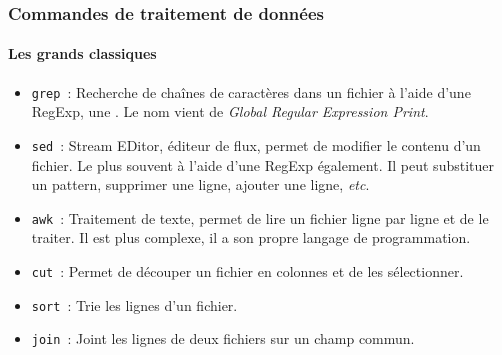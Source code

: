 \documentclass{beamer}
\begin{document}
    \begin{frame}
        \transdissolve
        \frametitle{Commandes de traitement de données}
        \framesubtitle{Les grands classiques}
        \begin{itemize}
            \item \lstinline{grep}~: Recherche de chaînes de caractères dans un fichier à l'aide d'une RegExp, une .
            Le nom vient de \textit{Global Regular Expression Print}.
            \item \lstinline{sed}~: Stream EDitor, éditeur de flux, permet de modifier le contenu d'un fichier.
            Le plus souvent à l'aide d'une RegExp également.
            Il peut substituer un pattern, supprimer une ligne, ajouter une ligne, \textit{etc}.
            \item \lstinline{awk}~: Traitement de texte, permet de lire un fichier ligne par ligne et de le traiter.
            Il est plus complexe, il a son propre langage de programmation.
            \item \lstinline{cut}~: Permet de découper un fichier en colonnes et de les sélectionner.
            \item \lstinline{sort}~: Trie les lignes d'un fichier.
            \item \lstinline{join}~: Joint les lignes de deux fichiers sur un champ commun.
        \end{itemize}
    \end{frame}
\end{document}

